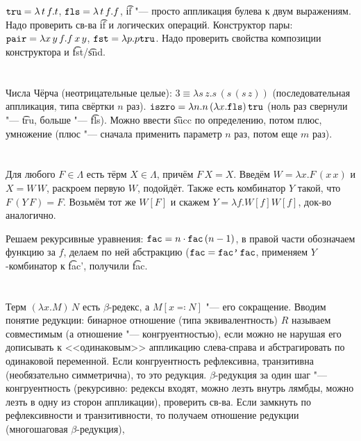 \section{} %
$\texttt{tru} = \lambda\,t\,f.t$, $\texttt{fls} = \lambda\,t\,f.f$,
\t{if} "--- просто аппликация булева к двум выражениям.
Надо проверить св-ва \t{if} и логических операций.
Конструктор пары: $\texttt{pair} = \lambda x\,y\,f.f\,x\,y$, $\texttt{fst}=\lambda p.p \texttt{tru}$.
Надо проверить свойства композиции конструктора и \t{fst}/\t{snd}.

\section{} %
Числа Чёрча (неотрицательные целые): $3\equiv \lambda s\,z.s\,(s\,(s\,z))$ (последовательная аппликация,
типа свёртки $n$ раз).
$\texttt{iszro}=\lambda n . n\,(\lambda x.\texttt{fls})\,\texttt{tru}$ (ноль раз свернули "--- \t{tru}, больше "--- \t{fls}).
Можно ввести \t{succ} по определению, потом плюс, умножение (плюс "--- сначала применить параметр $n$
раз, потом еще $m$ раз).

\section{} %
Для любого $F \in \Lambda$ есть тёрм $X \in \Lambda$, причём $F\, X = X$.
Введём $W=\lambda x . F\,(x\,x)$ и $X=W\,W$, раскроем первую $W$, подойдёт.
Также есть комбинатор $Y$ такой, что $F\,(Y\,F)=F$.
Возьмём тот же $W[F]$ и скажем $Y = \lambda f . W[f] W[f]$, док-во аналогично.

Решаем рекурсивные уравнения: $\texttt{fac} = n \cdot \texttt{fac}\,(n-1)$,
в правой части обозначаем функцию за $f$, делаем по ней абстракцию ($\texttt{fac} = \texttt{fac'}\,\texttt{fac}$,
применяем $Y$-комбинатор к \t{fac'}, получили \t{fac}.

\section{} %
Терм $(\lambda x . M)\, N$ есть $\beta$-редекс,	а $M[x \eqcolon N]$ "--- его сокращение.
Вводим понятие редукции: бинарное отношение (типа эквивалентность) $R$ называем совместимым
(а отношение "--- конгруентностью), если
можно не нарушая его дописывать к <<одинаковым>> аппликацию слева-справа и абстрагировать по одинаковой переменной.
Если конгруентность рефлексивна, транзитивна (необязательно симметрична), то это редукция.
$\beta$-редукция за один шаг "--- конгруентность (рекурсивно: редексы входят, можно лезть внутрь лямбды,
можно лезть в одну из сторон аппликации), проверить св-ва.
Если замкнуть по рефлексивности и транзитивности, то получаем отношение редукции (многошаговая $\beta$-редукция),

